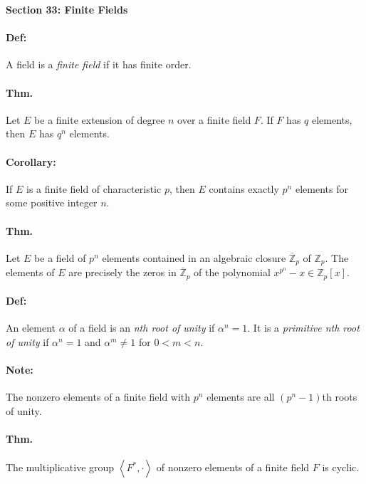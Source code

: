 \documentclass[10pt,a4paper]{article}
\begin{document}
\begin{center}
\textbf{Section 33: Finite Fields}
\end{center}

\paragraph{Def:} A field is a \textit{finite field} if it has finite order.

\paragraph{Thm.} Let $E$ be a finite extension of degree $n$ over a finite field $F$. If $F$ has $q$ elements, then $E$ has $q^n$ elements.

\paragraph{Corollary:} If $E$ is a finite field of characteristic $p$, then $E$ contains exactly $p^n$ elements for some positive integer $n$.

\paragraph{Thm.} Let $E$ be a field of $p^n$ elements contained in an algebraic closure $\bar{\mathbb{Z}}_p$ of $\mathbb{Z}_p$. The elements of $E$ are precisely the zeros in $\bar{\mathbb{Z}}_p$ of the polynomial $x^{p^n}-x \in \mathbb{Z}_p[x]$.

\paragraph{Def:} An element $\alpha$ of a field is an \textit{nth root of unity} if $\alpha^n =1$. It is a \textit{primitive nth root of unity} if $\alpha^n = 1$ and $\alpha^m \neq 1$ for $0 < m <n$.

\paragraph{Note:} The nonzero elements of a finite field with $p^n$ elements are all $(p^n-1)$th roots of unity.

\paragraph{Thm.} The multiplicative group $\left \langle F^*, \cdot \right \rangle$ of nonzero elements of a finite field $F$ is cyclic.
\end{document}
